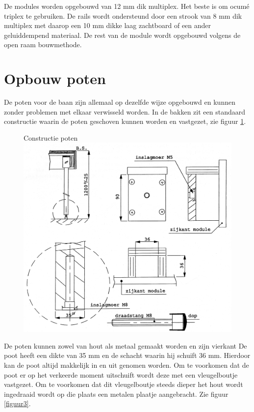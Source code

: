 \documentclass[12pt,a4paper]{report}
\begin{document}
De modules worden opgebouwd van 12 mm dik multiplex. Het beste is om ocum\'{e} triplex te gebruiken. De rails wordt ondersteund door een strook van 8 mm dik multiplex met daarop een 10 mm dikke laag zachtboard of een ander geluiddempend materiaal.
De rest van de module wordt opgebouwd volgens de open raam bouwmethode.

\section{Opbouw poten}
\label{se:poten}
De poten voor de baan zijn allemaal op dezelfde wijze opgebouwd en kunnen zonder problemen met elkaar verwisseld worden. In de bakken zit een standaard constructie waarin de poten geschoven kunnen worden en vastgezet, zie figuur \ref{figuur2}.

\begin{figure}[!ht]
  \captionbox
  {Constructie poten\label{figuur2}}
  {\includegraphics[scale=0.2]{images/rcu_figuur2}}
\end{figure}

De poten kunnen zowel van hout als metaal gemaakt worden en zijn vierkant De poot heeft een dikte van 35 mm en de schacht waarin hij schuift 36 mm. Hierdoor kan de poot altijd makkelijk in en uit genomen worden. Om te voorkomen dat de poot er op het verkeerde moment uitschuift wordt deze met een vleugelboutje vastgezet. Om te voorkomen dat dit vleugelboutje steeds dieper het hout wordt ingedraaid wordt op die plaats een metalen plaatje aangebracht. Zie figuur \ref{figuur3}.
\end{document}
